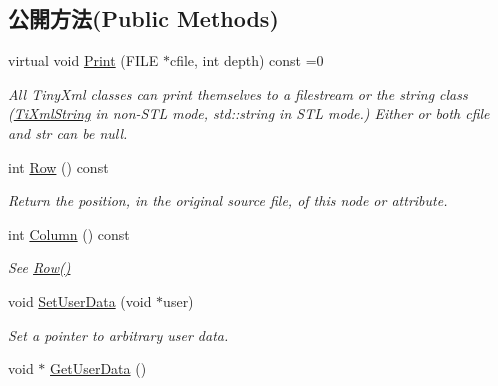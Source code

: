 \subsection*{公開方法(Public Methods)}
\begin{DoxyCompactItemize}
\item 
virtual void \hyperlink{class_ti_xml_base_aaea3e75b489fc3c937f3a7ef096069e7}{Print} (F\+I\+LE $\ast$cfile, int depth) const  =0
\begin{DoxyCompactList}\small\item\em All Tiny\+Xml classes can print themselves to a filestream or the string class (\hyperlink{class_ti_xml_string}{Ti\+Xml\+String} in non-\/\+S\+TL mode, std\+::string in S\+TL mode.) Either or both cfile and str can be null. \end{DoxyCompactList}\item 
int \hyperlink{class_ti_xml_base_a024bceb070188df92c2a8d8852dd0853}{Row} () const 
\begin{DoxyCompactList}\small\item\em Return the position, in the original source file, of this node or attribute. \end{DoxyCompactList}\item 
int \hyperlink{class_ti_xml_base_ab54bfb9b70fe6dd276e7b279cab7f003}{Column} () const \hypertarget{class_ti_xml_base_ab54bfb9b70fe6dd276e7b279cab7f003}{}\label{class_ti_xml_base_ab54bfb9b70fe6dd276e7b279cab7f003}

\begin{DoxyCompactList}\small\item\em See \hyperlink{class_ti_xml_base_a024bceb070188df92c2a8d8852dd0853}{Row()} \end{DoxyCompactList}\item 
void \hyperlink{class_ti_xml_base_ac6b3e0f790930d4970ec30764e937b5d}{Set\+User\+Data} (void $\ast$user)\hypertarget{class_ti_xml_base_ac6b3e0f790930d4970ec30764e937b5d}{}\label{class_ti_xml_base_ac6b3e0f790930d4970ec30764e937b5d}

\begin{DoxyCompactList}\small\item\em Set a pointer to arbitrary user data. \end{DoxyCompactList}\item 
void $\ast$ \hyperlink{class_ti_xml_base_a6559a530ca6763fc301a14d77ed28c17}{Get\+User\+Data} ()\hypertarget{class_ti_xml_base_a6559a530ca6763fc301a14d77ed28c17}{}\label{class_ti_xml_base_a6559a530ca6763fc301a14d77ed28c17}


\end{DoxyCompactItemize}
